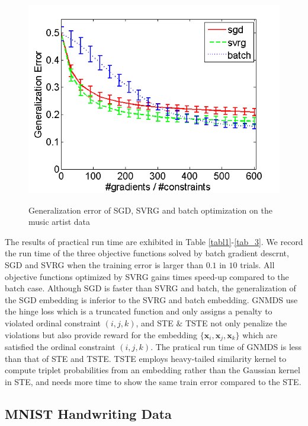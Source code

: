\documentclass[letterpaper]{article}
\begin{document}
\begin{figure}
{				\includegraphics[scale=0.33]{Music_TSTE_200_test.png}
			}
			\caption{Generalization error of SGD, SVRG and batch optimization on the music artist data}
			\label{fig:3} %
		\end{figure}

		The results of practical run time are exhibited in Table \ref{tabl1}-\ref{tab_3}. We record the run time of the three objective functions solved by batch gradient descrnt, SGD and SVRG when the training error is larger than $0.1$ in $10$ trials. All objective functions optimized by SVRG gains times speed-up compared to the batch case. Although SGD is faster than SVRG and batch, the generalization of the SGD embedding is inferior to the SVRG and batch embedding. GNMDS use the hinge loss which is a truncated function and only assigns a penalty to violated ordinal constraint $(i,j,k)$, and STE $\&$ TSTE not only penalize the violations but also provide reward for the embedding $\{\mathbf{x}_i, \mathbf{x}_j, \mathbf{x}_k\}$ which are satisfied the ordinal constraint $(i,j,k)$. The pratical run time of GNMDS is less than that of STE and TSTE. TSTE employs heavy-tailed similarity kernel to compute triplet probabilities from an embedding rather than the Gaussian kernel in STE, and needs more time to show the same train error compared to the STE.
		
		\subsection{MNIST Handwriting Data}
\end{document}
